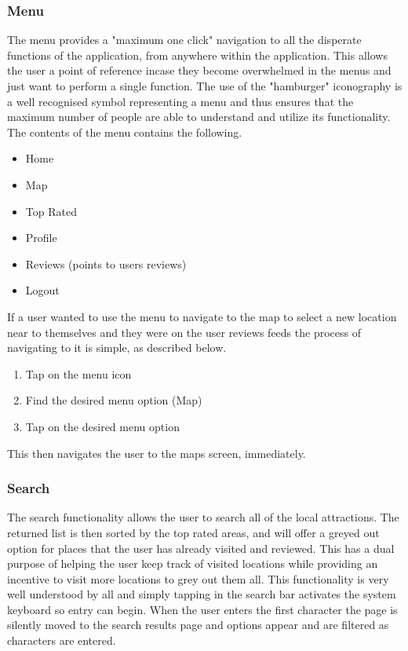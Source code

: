 \documentclass{article}
\begin{document}
\subsubsection{Menu}
The menu provides a "maximum one click" navigation to all the disperate functions of the application, from anywhere within the application.
This allows the user a point of reference incase they become overwhelmed in the menus and just want to perform a single function.
The use of the "hamburger" iconography is a well recognised symbol representing a menu and thus ensures that the maximum number of people are able to understand and utilize its functionality.
The contents of the menu contains the following.
\begin{itemize}
	\item Home
	\item Map
	\item Top Rated
	\item Profile
	\item Reviews (points to users reviews)
	\item Logout
\end{itemize}
If a user wanted to use the menu to navigate to the map to select a new location near to themselves and they were on the user reviews feeds the process of navigating to it is simple, as described below.
\begin{enumerate}
	\item Tap on the menu icon
	\item Find the desired menu option (Map)
	\item Tap on the desired menu option
\end{enumerate}
This then navigates the user to the maps screen, immediately.
\subsubsection{Search}
The search functionality allows the user to search all of the local attractions.
The returned list is then sorted by the top rated areas, and will offer a greyed out option for places that the user has already visited and reviewed.
This has a dual purpose of helping the user keep track of visited locations while providing an incentive to visit more locations to grey out them all.
This functionality is very well understood by all and simply tapping in the search bar activates the system keyboard so entry can begin.
When the user enters the first character the page is silently moved to the search results page and options appear and are filtered as characters are entered.
\end{document}
